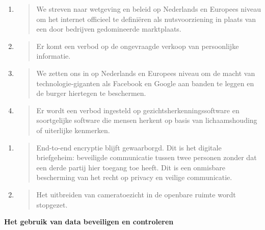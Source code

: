 \begin{enumerate}
\def\labelenumi{\arabic{enumi}.}
\item
  \begin{quote}
  We streven naar wetgeving en beleid op Nederlands en Europees niveau
  om het internet officieel te definiëren als nutsvoorziening in plaats
  van een door bedrijven gedomineerde marktplaats.
  \end{quote}
\item
  \begin{quote}
  Er komt een verbod op de ongevraagde verkoop van persoonlijke
  informatie.
  \end{quote}
\item
  \begin{quote}
  We zetten ons in op Nederlands en Europees niveau om de macht van
  technologie-giganten als Facebook en Google aan banden te leggen en de
  burger hiertegen te beschermen.
  \end{quote}
\item
  \begin{quote}
  Er wordt een verbod ingesteld op gezichtsherkenningssoftware en
  soortgelijke software die mensen herkent op basis van lichaamshouding
  of uiterlijke kenmerken.
  \end{quote}
\end{enumerate}

\begin{enumerate}
\def\labelenumi{\arabic{enumi}.}
\setcounter{enumi}{4}
\item
  \begin{quote}
  End-to-end encryptie blijft gewaarborgd. Dit is het digitale
  briefgeheim: beveiligde communicatie tussen twee personen zonder dat
  een derde partij hier toegang toe heeft. Dit is een onmisbare
  bescherming van het recht op privacy en veilige communicatie.
  \end{quote}
\item
  \begin{quote}
  Het uitbreiden van cameratoezicht in de openbare ruimte wordt
  stopgezet.
  \end{quote}
\end{enumerate}

\textbf{Het gebruik van data beveiligen en controleren}

